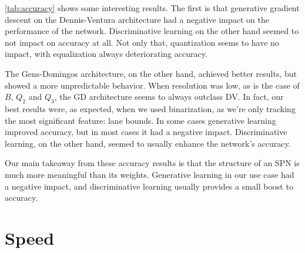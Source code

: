 \autoref{tab:accuracy} shows some interesting results. The first is that generative gradient
descent on the Dennis-Ventura architecture had a negative impact on the performance of
the network. Discriminative learning on the other hand seemed to not impact on accuracy at all. Not
only that, quantization seems to have no impact, with equalization always deteriorating accuracy.

The Gens-Domingos architecture, on the other hand, achieved better results, but showed a more
unpredictable behavior. When resolution was low, as is the case of $B$, $Q_2$ and $Q_3$, the GD
architecture seems to always outclass DV. In fact, our best results were, as expected, when we used
binarization, as we're only tracking the most significant feature: lane bounds. In some cases
generative learning improved accuracy, but in most cases it had a negative impact.  Discriminative
learning, on the other hand, seemed to usually enhance the network's accuracy.

Our main takeaway from these accuracy results is that the structure of an SPN is much more
meaningful than its weights. Generative learning in our use case had a negative impact, and
discriminative learning usually provides a small boost to accuracy.

\section{Speed}

